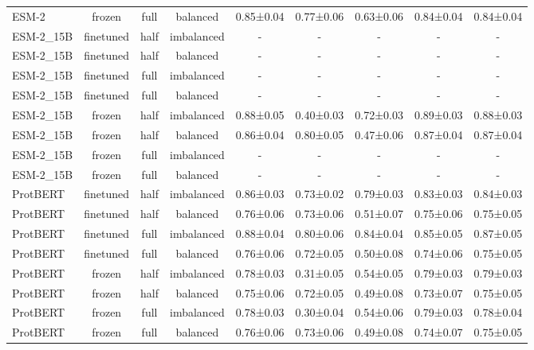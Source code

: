\begin{tabular}{lcccccccc}
       ESM-2 &         frozen &      full &   balanced & 0.85±0.04 & 0.77±0.06 & 0.63±0.06 & 0.84±0.04 & 0.84±0.04 \\
   ESM-2\_15B &      finetuned &      half & imbalanced &         - &         - &         - &         - &         - \\
   ESM-2\_15B &      finetuned &      half &   balanced &         - &         - &         - &         - &         - \\
   ESM-2\_15B &      finetuned &      full & imbalanced &         - &         - &         - &         - &         - \\
   ESM-2\_15B &      finetuned &      full &   balanced &         - &         - &         - &         - &         - \\
   ESM-2\_15B &         frozen &      half & imbalanced & 0.88±0.05 & 0.40±0.03 & 0.72±0.03 & 0.89±0.03 & 0.88±0.03 \\
   ESM-2\_15B &         frozen &      half &   balanced & 0.86±0.04 & 0.80±0.05 & 0.47±0.06 & 0.87±0.04 & 0.87±0.04 \\
   ESM-2\_15B &         frozen &      full & imbalanced &         - &         - &         - &         - &         - \\
   ESM-2\_15B &         frozen &      full &   balanced &         - &         - &         - &         - &         - \\
    ProtBERT &      finetuned &      half & imbalanced & 0.86±0.03 & 0.73±0.02 & 0.79±0.03 & 0.83±0.03 & 0.84±0.03 \\
    ProtBERT &      finetuned &      half &   balanced & 0.76±0.06 & 0.73±0.06 & 0.51±0.07 & 0.75±0.06 & 0.75±0.05 \\
    ProtBERT &      finetuned &      full & imbalanced & 0.88±0.04 & 0.80±0.06 & 0.84±0.04 & 0.85±0.05 & 0.87±0.05 \\
    ProtBERT &      finetuned &      full &   balanced & 0.76±0.06 & 0.72±0.05 & 0.50±0.08 & 0.74±0.06 & 0.75±0.05 \\
    ProtBERT &         frozen &      half & imbalanced & 0.78±0.03 & 0.31±0.05 & 0.54±0.05 & 0.79±0.03 & 0.79±0.03 \\
    ProtBERT &         frozen &      half &   balanced & 0.75±0.06 & 0.72±0.05 & 0.49±0.08 & 0.73±0.07 & 0.75±0.05 \\
    ProtBERT &         frozen &      full & imbalanced & 0.78±0.03 & 0.30±0.04 & 0.54±0.06 & 0.79±0.03 & 0.78±0.04 \\
    ProtBERT &         frozen &      full &   balanced & 0.76±0.06 & 0.73±0.06 & 0.49±0.08 & 0.74±0.07 & 0.75±0.05 \\

\end{tabular}
